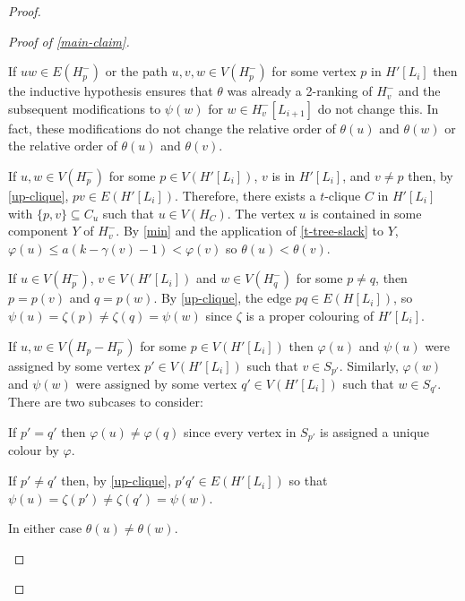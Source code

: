 \documentclass[kpfonts]{patmorin}
\theoremstyle{named}
\begin{document}
\begin{proof}
\begin{proof}[Proof of \cref{main-claim}]
\begin{compactenum}
          \item If $uw\in E(H^-_p)$ or the path $u,v,w\in V(H^-_p)$ for some vertex $p$ in $H'[L_i]$ then the inductive hypothesis ensures that $\theta$ was already a 2-ranking of $H^-_v$ and the subsequent modifications to $\psi(w)$ for $w\in H^-_v[L_{i+1}]$ do not change this. In fact, these modifications do not change the relative order of $\theta(u)$ and $\theta(w)$ or the relative order of $\theta(u)$ and $\theta(v)$.

          \item If $u,w\in V(H^-_p)$ for some $p\in V(H'[L_i])$, $v$ is in $H'[L_i]$, and $v\neq p$ then, by \cref{up-clique}, $pv\in E(H'[L_i])$.  Therefore, there exists a $t$-clique $C$ in $H'[L_i]$ with $\{p,v\}\subseteq C_u$ such that $u\in V(H_{C})$.  The vertex $u$ is contained in some component $Y$ of $H^-_v$. By \cref{min} and the application of \cref{t-tree-slack} to $Y$, $\varphi(u)\le a(k-\gamma(v)-1) < \varphi(v)$ so $\theta(u) < \theta(v)$.

          \item If $u\in V(H^-_{p})$, $v\in V(H'[L_i])$ and $w\in V(H^-_q)$ for some $p\neq q$, then $p=p(v)$ and $q=p(w)$.  By \cref{up-clique}, the edge $pq\in E(H[L_i])$, so $\psi(u)=\zeta(p)\neq\zeta(q)=\psi(w)$ since $\zeta$ is a proper colouring of $H'[L_i]$.

          \item If $u,w\in V(H_{p}-H^-_{p})$ for some $p\in V(H'[L_i])$ then $\varphi(u)$ and $\psi(u)$ were assigned by some vertex $p'\in V(H'[L_i])$ such that $v\in S_{p'}$.  Similarly, $\varphi(w)$ and $\psi(w)$ were assigned by some vertex $q'\in V(H'[L_i])$ such that $w\in S_{q'}$.  There are two subcases to consider:
          \begin{compactenum}
            \item If $p'=q'$ then $\varphi(u)\neq\varphi(q)$ since every vertex in $S_{p'}$ is assigned a unique colour by $\varphi$.
            \item If $p'\neq q'$ then, by \cref{up-clique}, $p'q'\in E(H'[L_i])$ so that $\psi(u)=\zeta(p')\neq\zeta(q')=\psi(w)$.
        \end{compactenum}
        In either case $\theta(u)\neq\theta(w)$.


\end{compactenum}
\end{proof}
\end{proof}
\end{document}
